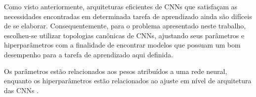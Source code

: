 
Como visto anteriormente, arquiteturas eficientes de CNNs que satisfaçam as necessidades encontradas em determinada tarefa de aprendizado ainda são difíceis de se elaborar. Consequentemente, para o problema apresentado neste trabalho, escolheu-se utilizar topologias canônicas de CNNs, ajustando seus parâmetros e hiperparâmetros com a finalidade de encontrar modelos que possuam um bom desempenho para a tarefa de aprendizado aqui definida.

Os parâmetros estão relacionados aos pesos atribuídos a uma rede neural, enquanto os hiperparâmetros estão relacionados ao ajuste em nível de arquitetura das CNNs \cite{chollet}.

